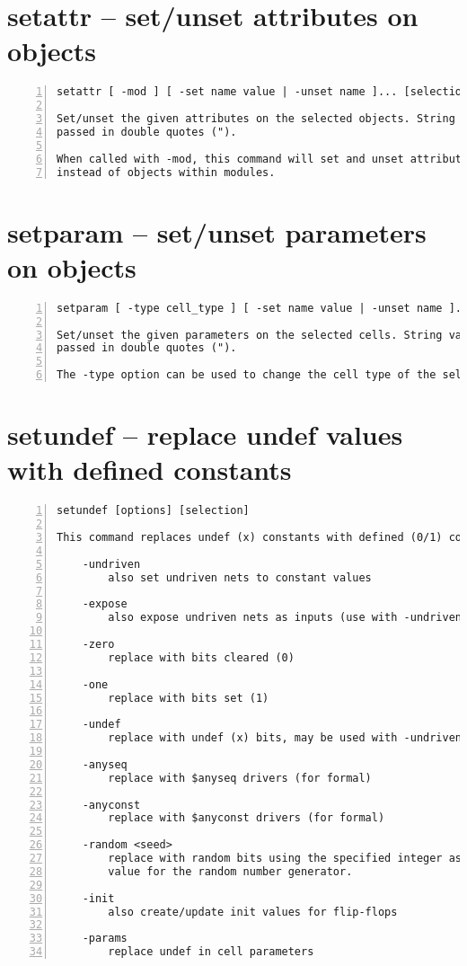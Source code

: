 \section{setattr -- set/unset attributes on objects}
\label{cmd:setattr}
\begin{lstlisting}[numbers=left,frame=single]
    setattr [ -mod ] [ -set name value | -unset name ]... [selection]

Set/unset the given attributes on the selected objects. String values must be
passed in double quotes (").

When called with -mod, this command will set and unset attributes on modules
instead of objects within modules.
\end{lstlisting}

\section{setparam -- set/unset parameters on objects}
\label{cmd:setparam}
\begin{lstlisting}[numbers=left,frame=single]
    setparam [ -type cell_type ] [ -set name value | -unset name ]... [selection]

Set/unset the given parameters on the selected cells. String values must be
passed in double quotes (").

The -type option can be used to change the cell type of the selected cells.
\end{lstlisting}

\section{setundef -- replace undef values with defined constants}
\label{cmd:setundef}
\begin{lstlisting}[numbers=left,frame=single]
    setundef [options] [selection]

This command replaces undef (x) constants with defined (0/1) constants.

    -undriven
        also set undriven nets to constant values

    -expose
        also expose undriven nets as inputs (use with -undriven)

    -zero
        replace with bits cleared (0)

    -one
        replace with bits set (1)

    -undef
        replace with undef (x) bits, may be used with -undriven

    -anyseq
        replace with $anyseq drivers (for formal)

    -anyconst
        replace with $anyconst drivers (for formal)

    -random <seed>
        replace with random bits using the specified integer as seed
        value for the random number generator.

    -init
        also create/update init values for flip-flops

    -params
        replace undef in cell parameters
\end{lstlisting}

